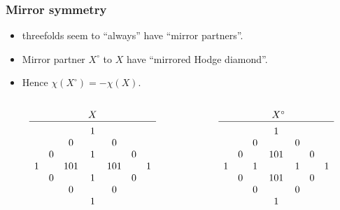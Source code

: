 \begin{frame}
\frametitle{Mirror symmetry}

\begin{itemize}
	\item \CY threefolds seem to ``always'' have ``mirror partners''.
	\item Mirror partner $X^\circ$ to $X$ have ``mirrored Hodge diamond''.
	\item Hence $\chi(X^\circ) = - \chi(X)$.
\end{itemize}

\unskip
\begin{columns}[onlytextwidth]
    {
        \begin{column}{0.48\textwidth}
            \[
                \begin{array}[c]{ccccccc}
                    &&& X                    \\
                    \hline                   \\[-1.8ex]
                    &&& 1                    \\
                    &&  0 && 0               \\
                    &   0 && 1   && 0        \\
                        1 && 101 && 101 && 1 \\
                    &   0 && 1   && 0        \\
                    &&  0 && 0               \\
                    &&& 1
                \end{array}
            \]
        \end{column}
    }

    {
        \begin{column}{0.48\textwidth}
            \[
                \begin{array}[c]{ccccccc}
                    &&& \phantom{^\circ}X^\circ \\
                    \hline                      \\[-1.8ex]
                    &&& 1                       \\  
                    &&  0 && 0                  \\
                    &   0 && 101 && 0           \\
                        1 && 1   && 1 && 1      \\
                    &   0 && 101 && 0           \\
                    &&  0 && 0                  \\
                    &&& 1
                \end{array}
            \]
        \end{column}
    }
\end{columns}


\end{frame}